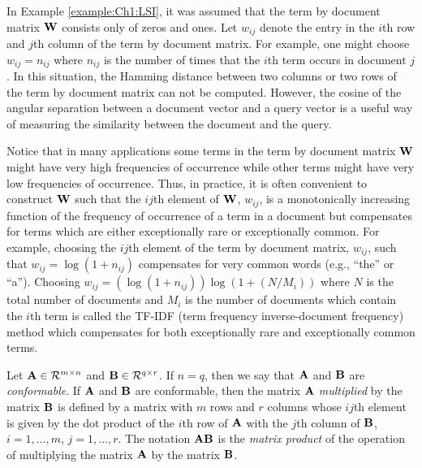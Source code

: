 \begin{example}
In Example \ref{example:Ch1:LSI}, it was assumed that the term by document matrix 
${\bf W}$ consists only of zeros and ones.
Let $w_{ij}$ denote the entry in the $i$th row and $j$th column of the term by document matrix. 
For example, one might choose $w_{ij} = n_{ij}$ where $n_{ij}$
is the number of times that the $i$th term occurs in 
document $j$. In this situation, the Hamming distance between two columns or two rows of the
term by document matrix can not be computed. However,
the cosine of the angular separation between a document vector and a query vector
is a useful way of measuring the similarity between the document and the query.

Notice that in many applications some terms in the term by document
matrix ${\bf W}$ might have very high
frequencies of occurrence  while other terms might have very low frequencies of occurrence. Thus,
in practice, it is often convenient to construct ${\bf W}$ such that the $ij$th element
of ${\bf W}$, $w_{ij}$, is a monotonically increasing function of the
 frequency of occurrence of a term in a document but compensates
for terms which are either exceptionally rare or exceptionally common.
For example, choosing the $ij$th element of the term by document
matrix, $w_{ij}$, such that $w_{ij} = \log (1 + n_{ij})$ compensates for very common words
(e.g., ``the'' or ``a'').  
Choosing $w_{ij} = (\log (1 + n_{ij})) \log \left(1 + (N/M_i) \right)$ 
where $N$ is the total number of documents and $M_i$ is the number of documents which contain
the $i$th term is called the TF-IDF (term frequency inverse-document frequency) method
which compensates for both exceptionally rare and exceptionally common terms.
\end{example} 

\begin{definition}
Let ${\bf A} \in {\cal R}^{m \times n}$ and ${\bf B} \in {\cal R}^{q \times r}$.
If $n = q$, then we say that ${\bf A}$ and ${\bf B}$
are {\em conformable}. If ${\bf A}$ and ${\bf B}$ are conformable, then the matrix
${\bf A}$ {\em multiplied} by the matrix ${\bf B}$ 
is defined by a matrix with $m$ rows and $r$ columns whose $ij$th element
is given by the dot product of the $i$th row of ${\bf A}$ with the $j$th column of
${\bf B}$, $i = 1, \ldots, m$, $j = 1, \ldots, r$. 
The notation ${\bf A}{\bf B}$ is the {\em matrix product} of the operation 
of multiplying the matrix ${\bf A}$ by the matrix ${\bf B}$.
\end{definition}

